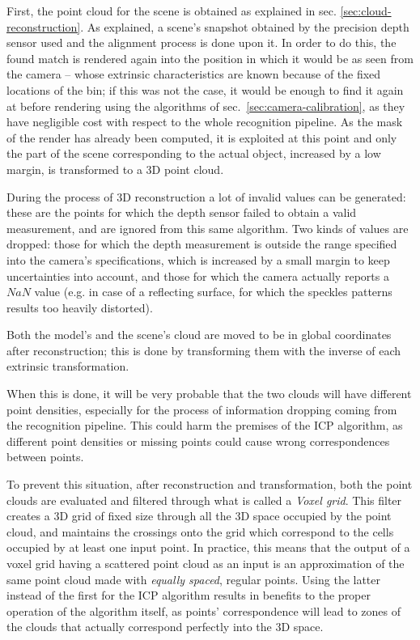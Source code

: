First, the point cloud for the scene is obtained as explained in sec. \ref{sec:cloud-reconstruction}.
As explained, a scene's snapshot obtained by the precision depth
sensor used and the alignment process is done upon it. In order to
do this, the found match is rendered again into the position in which
it would be as seen from the camera -- whose extrinsic characteristics
are known because of the fixed locations of the bin; if this was not
the case, it would be enough to find it again at before rendering
using the algorithms of sec.~\ref{sec:camera-calibration}, as they
have negligible cost with respect to the whole recognition pipeline.
As the mask of the render has already been computed, it is exploited at this
point and only the part of the scene corresponding to the actual
object, increased by a low margin, is
transformed to a 3D point cloud.

During the process of 3D reconstruction a lot of invalid values can be
generated: these are the points for which the depth sensor failed to obtain a
valid measurement, and are ignored from this same algorithm. Two kinds
of values are dropped: those for which the depth measurement is
outside the range specified into the camera's specifications, which
is increased by a small margin to keep uncertainties into account, and
those for which the camera actually reports a $NaN$ value (e.g. in
case of a reflecting surface, for which the speckles patterns results
too heavily distorted).

Both the model's and the scene's cloud are moved to be in global
coordinates after reconstruction; this is done by transforming them
with the inverse of each extrinsic transformation.

When this is done, it will be very probable that the two clouds will
have different point densities, especially for the process of
information dropping coming from the recognition pipeline. This could
harm the premises of the ICP algorithm, as different point densities
or missing points could cause wrong correspondences between points.

To prevent this situation, after reconstruction and transformation,
both the point clouds are evaluated and filtered through what is
called a \emph{Voxel grid}. This filter creates a 3D grid of fixed
size through all the 3D space occupied by the point cloud, and
maintains the crossings onto the grid which correspond to the cells
occupied by at least one input point. In practice, this means that the
output of a voxel grid having a scattered point cloud as an input is
an approximation of the same point cloud made with \emph{equally
  spaced}, regular points. Using the latter instead of the first for
the ICP algorithm results in benefits to the proper
operation of the algorithm itself, as points' correspondence will
lead to zones of the clouds that actually correspond perfectly into the 3D space.

